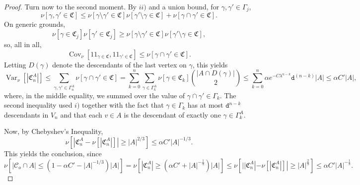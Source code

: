 \documentclass[article,11pt,reqno]{amsart}
\newcommand{\id}{1\! \!1}
\begin{document}
\begin{appendix}
\begin{proof}
Turn now to the second moment. 
By $ii)$ and a union bound, for $\gamma,\gamma'\in \Gamma_j$,
$$
\nu[\gamma,\gamma'\in \mathfrak{C}]\leq \nu[\gamma\setminus \gamma'\in \mathfrak{C}]\nu[\gamma'\setminus \gamma \in \mathfrak{C}]+\nu[\gamma\cap \gamma'\in \mathfrak{C}].
$$
On generic grounds, 
$$
\nu[\gamma\in \mathfrak{C}_j]\nu[\gamma'\in \mathfrak{C}_j]\geq \nu[\gamma\setminus \gamma'\in \mathfrak{C}]\nu[\gamma'\setminus \gamma\in\mathfrak{C}],
$$
so, all in all,
$$
\operatorname{Cov}_{\nu}[\id_{\gamma\in \mathfrak{C}},\id_{\gamma'\in \mathfrak{C}} ]\leq \nu[\gamma\cap \gamma'\in \mathfrak{C}].
$$
Letting $D(\gamma)$ denote the descendants of the last vertex on $\gamma$, this yields
$$
\operatorname{Var}_{\nu}[|\mathfrak{C}^A_n|]\leq  \sum_{\gamma,\gamma'\in \Gamma^A_n}\nu[\gamma\cap \gamma'\in \mathfrak{C}]=\sum_{k=0}^n \sum_{\gamma\in \Gamma^A_k}\nu[\gamma\in \mathfrak{C}_k] {|A\cap D(\gamma)| \choose 2}\leq \sum_{k=0}^n \alpha e^{-C \lambda^{
    n-k}} \mathtt{d}^{(n-k)} |A|\leq \alpha C' |A|,
$$
where, in the middle equality, we summed over the value of $\gamma\cap \gamma'\in \Gamma_k$.  The second inequality used $i)$ together with the fact that $\gamma\in \Gamma_k$ has at most $\mathtt{d}^{n-k}$ descendants in $V_n$ and that each $v\in A$ is the descendant of exactly one $\gamma\in \Gamma_k^A$.

Now, by Chebyshev's Inequality,
$$
\nu[|\mathfrak{C}^A_n-\nu[|\mathfrak{C}^A_n|]|\geq |A|^{2/3}]\leq  \alpha C'|A|^{-1/3}.
$$
This yields the conclusion, since %
 $$
 \nu[|\mathcal{C}_o\cap A|\leq (1-\alpha C'-|A|^{-1/3})|A|]=\nu[|\mathfrak{C}^{A}_n|\geq (\alpha C'+|A|^{-\frac{1}{3}}) |A|]\leq \nu[||\mathfrak{C}^{A}_n|-\nu[|\mathfrak{C}^{A}_n|]|\geq |A|^{\frac{2}{3}}]\leq \alpha C'|A|^{-\frac{1}{3}}.
 $$
\end{proof}

\begin{figure}[ht]
\centering
\begin{tikzpicture}[
    scale=1,
    every node/.style={font=\small},
    shared/.style={draw=violet!70!black, fill=violet!30, thick, circle, inner sep=2.5pt},
    gammanode/.style={draw=red!70!black, fill=red!30, circle, inner sep=2pt},
    gammapnode/.style={draw=blue!70!black, fill=blue!30, circle, inner sep=2pt},
    ghostnode/.style={draw=black!25, fill=black!10, circle, inner sep=1.5pt},
    sharedline/.style={violet!70!black, line width=1.8pt},
    gammaline/.style={red!60!black, line width=1.4pt},
    gammaprline/.style={blue!60!black, line width=1.4pt},
    ghostline/.style={black!15, line width=0.5pt},
    genlabel/.style={font=\footnotesize\itshape, text=black!50},
]


\end{tikzpicture}
\end{figure}
\end{appendix}
\end{document}
